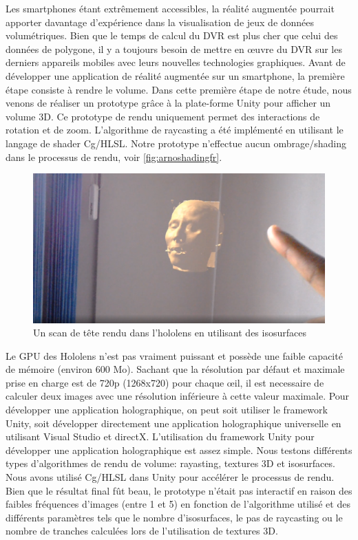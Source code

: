Les smartphones étant extrêmement accessibles, la réalité augmentée pourrait apporter davantage d'expérience dans la visualisation de jeux de données volumétriques. Bien que le temps de calcul du DVR est plus cher que celui des données de polygone, il y a
toujours besoin de mettre en œuvre du DVR sur les derniers appareils mobiles avec leurs
nouvelles technologies graphiques. Avant de développer une application de réalité augmentée sur un smartphone, la première étape consiste à rendre le volume. Dans cette première étape de notre étude, nous venons de réaliser un prototype grâce à la plate-forme Unity pour afficher un volume 3D. Ce prototype de rendu uniquement permet des interactions de rotation et de zoom. L'algorithme de raycasting a été implémenté en utilisant le langage de shader Cg/HLSL. Notre prototype n'effectue aucun ombrage/shading dans le processus de rendu, voir \autoref{fig:arnoshadingfr}.


\begin{figure}
\centering
\includegraphics [width=\textwidth]{Figures/mixediso}
\caption{Un scan de tête rendu dans l'hololens en utilisant des isosurfaces }
\label{fig:mixedisofr}
\end{figure}

Le GPU des Hololens n'est pas vraiment puissant et possède une faible capacité de mémoire (environ 600 Mo). Sachant que la résolution par défaut et maximale prise en charge est de 720p (1268x720) pour chaque œil, il est necessaire de calculer deux images avec une résolution inférieure à cette valeur maximale. Pour développer une application holographique, on peut soit utiliser le framework Unity, soit développer directement une application holographique universelle en utilisant Visual Studio et directX. L'utilisation du framework Unity pour développer une application holographique est assez simple. Nous testons différents types d’algorithmes de rendu de volume: rayasting, textures 3D et isosurfaces.
Nous avons utilisé Cg/HLSL dans Unity pour accélérer le processus de rendu. Bien que le résultat final fût beau, le prototype n'était pas interactif en raison des faibles fréquences d'images (entre 1 et 5) en fonction de l'algorithme utilisé et des différents paramètres tels que le nombre d'isosurfaces, le pas de raycasting ou le nombre de tranches calculées lors de l'utilisation de textures 3D.


